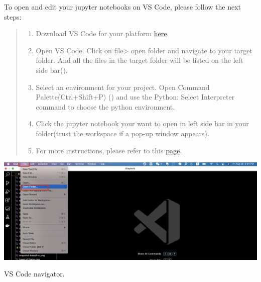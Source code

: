 \documentclass{latex-template/tufte-handout}
\begin{document}
To open and edit your jupyter notebooks on VS Code, please follow the next steps:
\begin{quote}
\begin{enumerate}
\def\labelenumi{\arabic{enumi}.}
\item Download VS Code for your platform \href{https://code.visualstudio.com/Download}{here}.
\item Open VS Code. Click on file> open folder and navigate to your target folder. And all the files in the target folder will be listed on the left side bar().
\item Select an environment for your project. Open Command Palette(Ctrl+Shift+P) () and use the Python: Select Interpreter command to choose the python environment.
\item Click the jupyter notebook your want to open in left side bar in your folder(trust the workspace if a pop-up window appears). 
\item For more instructions, please refer to this \href{https://code.visualstudio.com/docs/datascience/jupyter-notebooks}{page}.




\end{enumerate}
\end{quote}

\begin{marginfigure}%
  \includegraphics[width=1.3\linewidth]{assets/07-openfile-vscode.jpg}
  \caption{VS Code navigator.}
  \label{fig:vscode-navigator}
\end{marginfigure}
\end{document}
